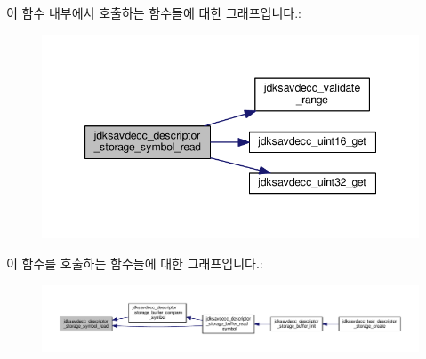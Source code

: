 이 함수 내부에서 호출하는 함수들에 대한 그래프입니다.\+:
\nopagebreak
\begin{figure}[H]
\begin{center}
\leavevmode
\includegraphics[width=347pt]{group__descriptor__storage__symbol_gaeec6b1c9baca472aa2b9ca085ae70d21_cgraph}
\end{center}
\end{figure}




이 함수를 호출하는 함수들에 대한 그래프입니다.\+:
\nopagebreak
\begin{figure}[H]
\begin{center}
\leavevmode
\includegraphics[width=350pt]{group__descriptor__storage__symbol_gaeec6b1c9baca472aa2b9ca085ae70d21_icgraph}
\end{center}
\end{figure}


